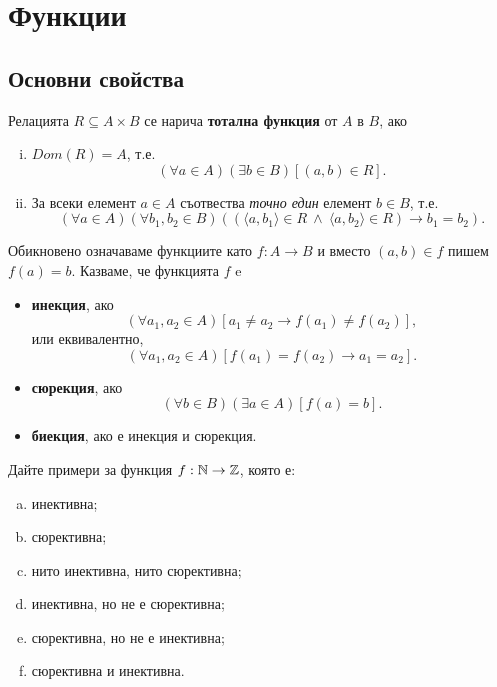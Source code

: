 \chapter{Функции}

\section{Основни свойства}

Релацията $R \subseteq A\times B$ се нарича {\bf тотална функция} от $A$ в $B$, ако
\begin{enumerate}[i)]
\item
  $Dom(R) = A$, т.е.
  \[(\forall a\in A)(\exists b\in B)[(a,b)\in R].\]
\item
  За всеки елемент $a\in A$ съотвества {\em точно един} елемент $b \in B$, т.е.
  \[(\forall a\in A)(\forall b_1,b_2 \in B)((\langle{a,b_1}\rangle\in R\ \wedge\ \langle{a,b_2}\rangle\in R) \rightarrow b_1 = b_2).\]
\end{enumerate}
Обикновено означаваме функциите като $f:A\to B$ и
вместо $(a,b)\in f$ пишем $f(a) = b$.
Казваме, че функцията $f$ e
\begin{itemize}
\item
  {\bf инекция}, ако 
  \[(\forall a_1,a_2\in A)[a_1\neq a_2 \rightarrow f(a_1)\neq f(a_2)],\]
  или еквивалентно,
  \[(\forall a_1,a_2\in A)[f(a_1) = f(a_2) \rightarrow a_1 = a_2].\]
\item
  {\bf сюрекция}, ако 
  \[(\forall b\in B)(\exists a\in A)[f(a) = b].\]
\item
  {\bf биекция}, ако е инекция и сюрекция.
\end{itemize}

\begin{problem}
  Дайте примери за функция $f:\mathbb{N}\rightarrow\mathbb{Z}$, която е:
  \begin{enumerate}[a)]
  \item
    инективна;
  \item
    сюрективна;
  \item
    нито инективна, нито сюрективна;
  \item
    инективна, но не е сюрективна;
  \item
    сюрективна, но не е инективна;
  \item
    сюрективна и инективна.
  \end{enumerate}
\end{problem}


